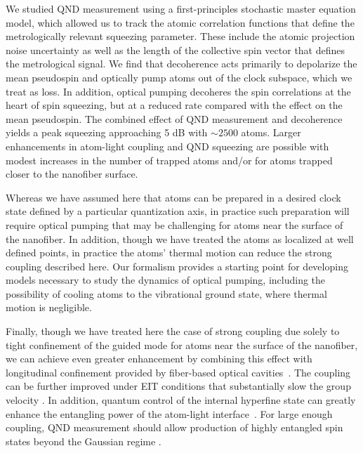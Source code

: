 \documentclass[preprint, aps,pra,onecolumn]{revtex4-1} %
\begin{document}
We studied QND measurement using a first-principles stochastic master equation model, which allowed us to track the atomic correlation functions that define the metrologically relevant squeezing parameter.  
These include the atomic projection noise uncertainty as well as the length of the collective spin vector that defines the metrological signal.  We find that decoherence acts primarily to depolarize the mean pseudospin and optically pump atoms out of the clock subspace, which we treat as loss.  In addition, optical pumping decoheres the spin correlations at the heart of spin squeezing, but at a reduced rate compared with the effect on the mean pseudospin.  
The combined effect of QND measurement and decoherence yields a peak squeezing approaching 5 dB with $\sim 2500$ atoms. Larger enhancements in atom-light coupling and QND squeezing are possible with modest increases in the number of trapped atoms and/or for atoms trapped closer to the nanofiber surface.  

Whereas we have assumed here that atoms can be prepared in a desired clock state defined by a particular quantization axis, in practice such preparation will require optical pumping that may be challenging for atoms near the surface of the nanofiber.   In addition, though we have treated the atoms as localized at well defined points, in practice the atoms' thermal motion can reduce the strong coupling described here.  Our formalism  provides a starting point for developing models necessary to study the dynamics of optical pumping, including the possibility of cooling atoms to the vibrational ground state, where thermal motion is negligible. 

Finally, though we have treated here the case of strong coupling due solely to tight confinement of the guided mode for atoms near the surface of the nanofiber,  we can achieve even greater enhancement  by combining this effect with longitudinal confinement provided by fiber-based optical cavities~\cite{le_kien_intracavity_2009, wuttke_nanofiber_2012, yalla_cavity_2014, bohnet_reduced_2014, nayak_optical_2014}.  
The coupling can be further improved under EIT conditions that substantially slow the group velocity \cite{gouraud_demonstration_2015, sayrin_storage_2015, kumar_autler-townes_2015, le_kien_electromagnetically_2015}.  In addition, quantum control of the internal hyperfine state \cite{smith_quantum_2013-1} can greatly enhance the entangling power of the atom-light interface~\cite{trail_strongly_2010, norris_enhanced_2012}. 
For large enough coupling, QND measurement should allow production of highly entangled spin states beyond the Gaussian regime \cite{stockton_deterministic_2004, mcconnell_entanglement_2015}.
\end{document}
